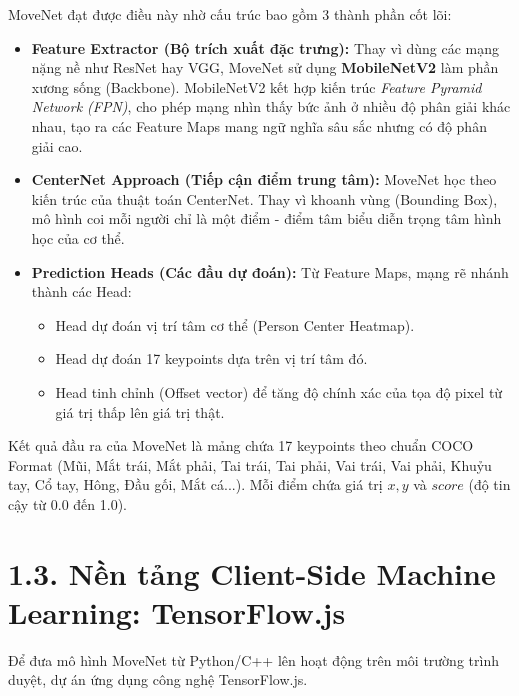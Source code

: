 \documentclass[12pt,a4paper]{report}
\begin{document}
MoveNet đạt được điều này nhờ cấu trúc bao gồm 3 thành phần cốt lõi:
\begin{itemize}
    \item \textbf{Feature Extractor (Bộ trích xuất đặc trưng):} Thay vì dùng các mạng nặng nề như ResNet hay VGG, MoveNet sử dụng \textbf{MobileNetV2} làm phần xương sống (Backbone). MobileNetV2 kết hợp kiến trúc \textit{Feature Pyramid Network (FPN)}, cho phép mạng nhìn thấy bức ảnh ở nhiều độ phân giải khác nhau, tạo ra các Feature Maps mang ngữ nghĩa sâu sắc nhưng có độ phân giải cao.
    \item \textbf{CenterNet Approach (Tiếp cận điểm trung tâm):} MoveNet học theo kiến trúc của thuật toán CenterNet. Thay vì khoanh vùng (Bounding Box), mô hình coi mỗi người chỉ là một điểm - điểm tâm biểu diễn trọng tâm hình học của cơ thể. 
    \item \textbf{Prediction Heads (Các đầu dự đoán):} Từ Feature Maps, mạng rẽ nhánh thành các Head:
    \begin{itemize}
        \item Head dự đoán vị trí tâm cơ thể (Person Center Heatmap).
        \item Head dự đoán 17 keypoints dựa trên vị trí tâm đó.
        \item Head tinh chỉnh (Offset vector) để tăng độ chính xác của tọa độ pixel từ giá trị thấp lên giá trị thật.
    \end{itemize}
\end{itemize}

Kết quả đầu ra của MoveNet là mảng chứa 17 keypoints theo chuẩn COCO Format (Mũi, Mắt trái, Mắt phải, Tai trái, Tai phải, Vai trái, Vai phải, Khuỷu tay, Cổ tay, Hông, Đầu gối, Mắt cá...). Mỗi điểm chứa giá trị $x, y$ và $score$ (độ tin cậy từ 0.0 đến 1.0).

\section{1.3. Nền tảng Client-Side Machine Learning: TensorFlow.js}
Để đưa mô hình MoveNet từ Python/C++ lên hoạt động trên môi trường trình duyệt, dự án ứng dụng công nghệ TensorFlow.js.
\end{document}
